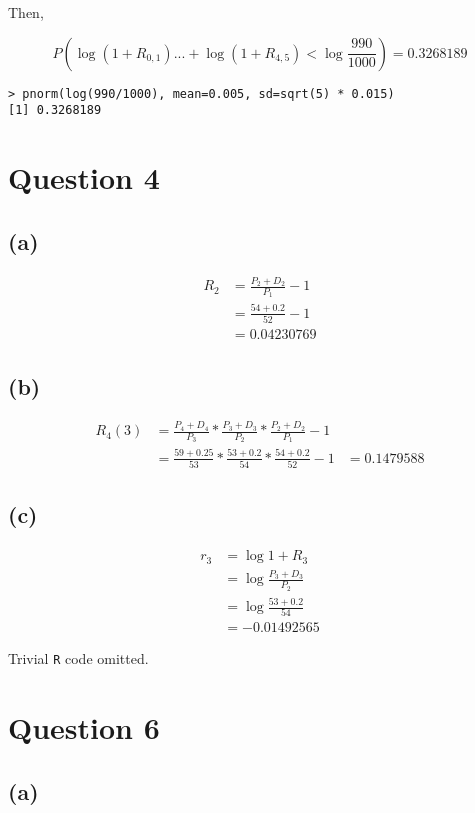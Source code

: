 \documentclass[11pt]{scrartcl}
\begin{document}
Then,

\[P\left(\log{(1+R_{0,1})} ... + \log{(1+R_{4,5})} < \log{\frac{990}{1000}} \right) = 0.3268189\]

\begin{lstlisting}
> pnorm(log(990/1000), mean=0.005, sd=sqrt(5) * 0.015)
[1] 0.3268189
\end{lstlisting}

\section*{Question 4}
\subsection*{(a)}
\begin{align*}
R_2 &= \frac{P_2 + D_2}{P_1} - 1 \\
&= \frac{54 + 0.2}{52} - 1 \\
&= 0.04230769
\end{align*}

\subsection*{(b)}
\begin{align*}
R_4(3) &= \frac{P_4 + D_4}{P_3} * \frac{P_3 + D_3}{P_2} * \frac{P_2 + D_2}{P_1} - 1 \\
&= \frac{59 + 0.25}{53} * \frac{53 + 0.2}{54} * \frac{54 + 0.2}{52} - 1
&= 0.1479588
\end{align*}

\subsection*{(c)}
\begin{align*}
r_3 &= \log{1+R_3} \\
&= \log{\frac{P_3 + D_3}{P_2}} \\
&= \log{\frac{53 + 0.2}{54}} \\
&= -0.01492565
\end{align*}

Trivial \texttt{R} code omitted.

\section*{Question 6}
\subsection*{(a)}
\end{document}

